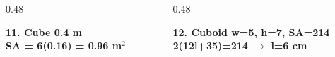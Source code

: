 \documentclass[aspectratio=169,12pt]{beamer}
\begin{document}
\begin{frame}[t]
\begin{columns}[T,onlytextwidth]
\end{columns}
\vspace{0.15em}
\begin{columns}[T,onlytextwidth]
\begin{column}{0.48\textwidth}\begin{AnsCard}\small\textcolor{mmgreenDeep}{\textbf{11. Cube 0.4 m}}\\\vspace{0.1em}\textcolor{mmanswerColor}{\textbf{SA = 6(0.16) = 0.96 m$^2$}}\end{AnsCard}\end{column}
\begin{column}{0.48\textwidth}\begin{AnsCard}\small\textcolor{mmgreenDeep}{\textbf{12. Cuboid w=5, h=7, SA=214}}\\\vspace{0.1em}\textcolor{mmanswerColor}{\textbf{2(12l+35)=214 $\to$ l=6 cm}}\end{AnsCard}\end{column}
\end{columns}
\end{frame}
\end{document}
